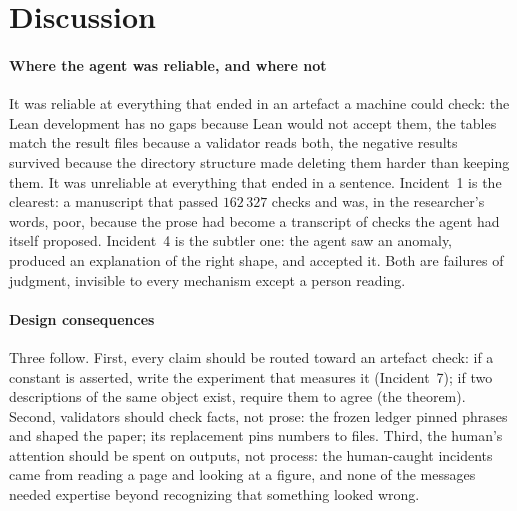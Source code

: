 \section{Discussion}
\label{sec:discussion}

\paragraph{Where the agent was reliable, and where not}
It was reliable at everything that ended in an artefact a machine could check: the Lean
development has no gaps because Lean would not accept them, the tables match the result files
because a validator reads both, the negative results survived because the directory structure made
deleting them harder than keeping them. It was unreliable at everything that ended in a sentence.
Incident~1 is the clearest: a manuscript that passed $162\,327$ checks and was, in the researcher's
words, poor, because the prose had become a transcript of checks the agent had itself proposed. Incident~4 is the subtler one: the agent saw an anomaly, produced an
explanation of the right shape, and accepted it. Both are failures of judgment, invisible to every
mechanism except a person reading.

\paragraph{Design consequences}
Three follow. First, every claim should be routed toward an artefact check: if a constant is
asserted, write the experiment that measures it (Incident~7); if two descriptions of the same object
exist, require them to agree (the theorem). Second, validators should check facts, not prose: the
frozen ledger pinned phrases and shaped the paper; its replacement pins numbers to files. Third, the
human's attention should be spent on outputs, not process: the human-caught incidents came from
reading a page and looking at a figure, and none of the \nHuman{} messages needed expertise beyond
recognizing that something looked wrong.
